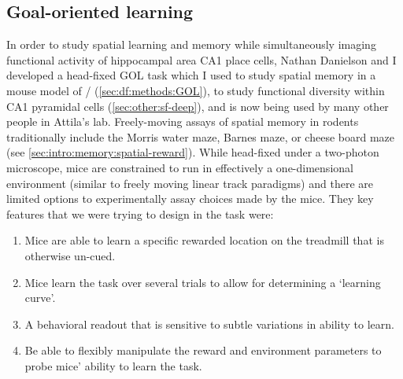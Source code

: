 \subsection{Goal-oriented learning}
\label{sec:intro:techniques:GOL}
In order to study spatial learning and memory while simultaneously imaging functional activity of hippocampal area CA1 place cells, Nathan Danielson and I developed a head-fixed \acl{GOL} task which I used to study spatial memory in a mouse model of \scz/ (\autoref{sec:df:methods:GOL}), to study functional diversity within CA1 pyramidal cells (\autoref{sec:other:sf-deep}), and is now being used by many other people in Attila's lab.
Freely-moving assays of spatial memory in rodents traditionally include the Morris water maze, Barnes maze, or cheese board maze (see \autoref{sec:intro:memory:spatial-reward}).
While head-fixed under a two-photon microscope, mice are constrained to run in effectively a one-dimensional environment (similar to freely moving linear track paradigms) and there are limited options to experimentally assay choices made by the mice.
They key features that we were trying to design in the task were:
\begin{enumerate}
	\item Mice are able to learn a specific rewarded location on the treadmill that is otherwise un-cued.\label{item:into:techniques:GOL:location}
	\item Mice learn the task over several trials to allow for determining a `learning curve'.\label{item:into:techniques:GOL:learning}
	\item A behavioral readout that is sensitive to subtle variations in ability to learn.\label{item:into:techniques:GOL:readout}
	\item Be able to flexibly manipulate the reward and environment parameters to probe mice' ability to learn the task.\label{item:into:techniques:GOL:manip}
\end{enumerate}

